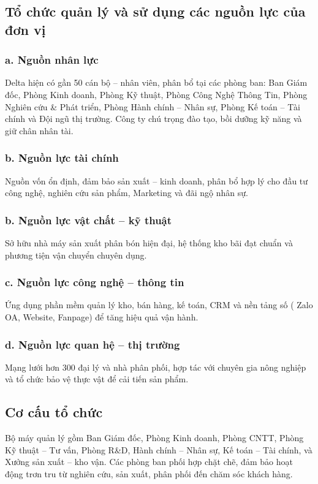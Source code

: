 \subsection{ Tổ chức quản lý và sử dụng các nguồn lực của đơn vị}
\subsubsection{a. Nguồn nhân lực}
Delta hiện có gần 50 cán bộ – nhân viên, phân bổ tại các phòng ban: Ban Giám đốc, Phòng Kinh doanh, Phòng Kỹ thuật, Phòng Công Nghệ Thông Tin, Phòng Nghiên cứu \& Phát triển, Phòng Hành chính – Nhân sự, Phòng Kế toán – Tài chính và Đội ngũ thị trường. Công ty chú trọng đào tạo, bồi dưỡng kỹ năng và giữ chân nhân tài.
\subsubsection*{b. Nguồn lực tài chính}
Nguồn vốn ổn định, đảm bảo sản xuất – kinh doanh, phân bổ hợp lý cho đầu tư công nghệ, nghiên cứu sản phẩm, Marketing và đãi ngộ nhân sự.
\subsubsection*{b. Nguồn lực vật chất – kỹ thuật}
Sở hữu nhà máy sản xuất phân bón hiện đại, hệ thống kho bãi đạt chuẩn và phương tiện vận chuyển chuyên dụng.
\subsubsection*{c. Nguồn lực công nghệ – thông tin}
Ứng dụng phần mềm quản lý kho, bán hàng, kế toán, CRM và nền tảng số ( Zalo OA, Website, Fanpage) để tăng hiệu quả vận hành.
\subsubsection*{d. Nguồn lực quan hệ – thị trường}
Mạng lưới hơn 300 đại lý và nhà phân phối, hợp tác với chuyên gia nông nghiệp và tổ chức bảo vệ thực vật để cải tiến sản phẩm.

\subsection{ Cơ cấu tổ chức}
Bộ máy quản lý gồm Ban Giám đốc, Phòng Kinh doanh, Phòng CNTT, Phòng Kỹ thuật – Tư vấn, Phòng R\&D, Hành chính – Nhân sự, Kế toán – Tài chính, và Xưởng sản xuất – kho vận. Các phòng ban phối hợp chặt chẽ, đảm bảo hoạt động trơn tru từ nghiên cứu, sản xuất, phân phối đến chăm sóc khách hàng.

